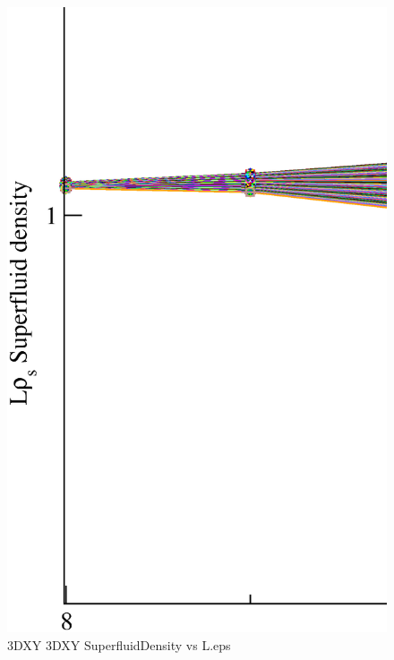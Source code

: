 \begin{figure}[!htpb]
  \centering
  \includegraphics[width=\textwidth]{./plots/3DXY/3DXY_SuperfluidDensity_vs_L.eps}
  \caption{3DXY 3DXY SuperfluidDensity vs L.eps}
\end{figure}

